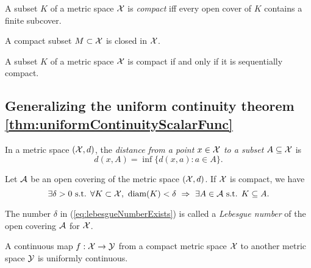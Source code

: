 \begin{defn}
  \label{def:compactness}
  A subset $K$ of a metric space ${\cal X}$ is \emph{compact}
  iff every open cover of $K$ contains a finite subcover.
\end{defn}

\begin{lem}
  \label{lem:compactImpliesClosed}
  A compact subset $M\subset {\cal X}$ is closed in ${\cal X}$.
\end{lem}

\begin{thm}
  \label{thm:compactIsSequCompact}
  A subset $K$ of a metric space ${\cal X}$ is compact
  if and only if it is sequentially compact. 
\end{thm}

\subsection{Generalizing
  the uniform continuity theorem
  \ref{thm:uniformContinuityScalarFunc}}
\label{sec:gener-unif-cont}

\begin{defn}
  \label{def:distancePoint2Set}
  In a metric space $({\cal X},d)$,
  the \emph{distance from a point $x\in{\cal X}$
    to a subset $A\subseteq {\cal X}$} is
  \begin{equation}
    \label{eq:distancePoint2Set}
    d(x,A) = \inf\{d(x,a): a\in A\}.
  \end{equation}
\end{defn}

\begin{lem}
  \label{lem:lebesgueNumberExists}
  Let ${\cal A}$ be an open covering
  of the metric space $({\cal X},d)$. 
  If ${\cal X}$ is compact, we have
  \begin{equation}
    \label{eq:lebesgueNumberExists}
    \exists \delta>0 \text{ s.t. }
    \forall K\subset {\cal X},\
    \text{diam}(K)<\delta\ \Rightarrow\
    \exists A\in{\cal A} \text{ s.t. } K\subseteq A.
  \end{equation}
\end{lem}

\begin{defn}
  \label{def:lebesgueNumber}
  The number $\delta$ in (\ref{eq:lebesgueNumberExists})
  is called a \emph{Lebesgue number}
  of the open covering ${\cal A}$ for ${\cal X}$.
\end{defn}

\begin{thm}
  \label{thm:generalizedUniformContinuity}
  A continuous map $f:{\cal X}\rightarrow {\cal Y}$
  from a compact metric space ${\cal X}$
  to another metric space ${\cal Y}$
  is uniformly continuous.
\end{thm}

